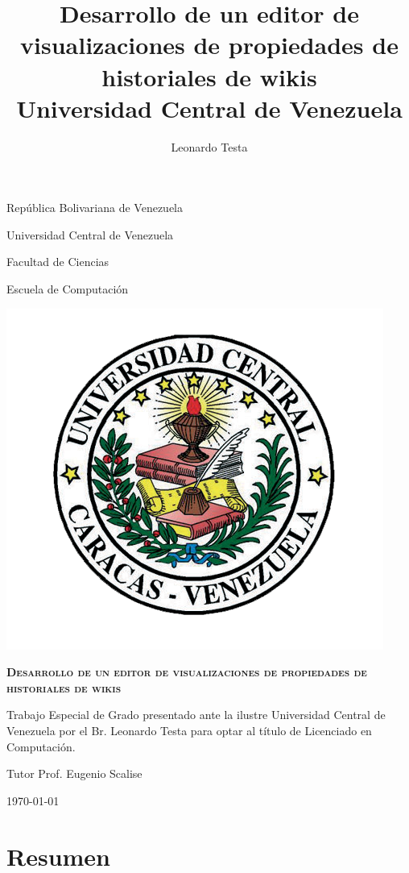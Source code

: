\documentclass[12pt]{report}
\title{
	{Desarrollo de un editor de visualizaciones de propiedades de historiales de wikis}\\
	{\large Universidad Central de Venezuela}\\
}
\author{Leonardo Testa}
\begin{document}
\begin{titlepage}
	\centering
  {\large República Bolivariana de Venezuela \par}
  {\large Universidad Central de Venezuela\par}
  {\large Facultad de Ciencias\par}
  {\large Escuela de Computación\par}\vspace{2cm}

	\includegraphics[scale=0.60]{ucv_logo.png}\par\vspace{1cm}
	{\scshape\Large\textbf{Desarrollo de un editor de visualizaciones de propiedades de historiales de wikis}\par}
	\vfill

  	{\large Trabajo Especial de Grado presentado ante la ilustre Universidad Central de Venezuela por el Br. Leonardo Testa para optar al título de Licenciado en Computación.\par}
    {\large Tutor Prof. Eugenio Scalise \par}
	{\large \mydate\today \par}
\end{titlepage}

\chapter*{Resumen}

\end{document}
